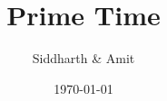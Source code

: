 \documentclass{beamer}
\title{Prime Time}
\author{Siddharth \& Amit}
\date{\today}
\begin{document}
\frame{\titlepage}
\end{document}
